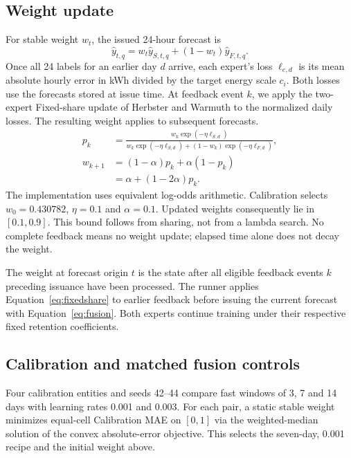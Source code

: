 \subsection{Weight update}
For stable weight $w_t$, the issued 24-hour forecast is
\begin{equation}
\hat y_{t,q}=w_t\hat y_{S,t,q}+(1-w_t)\hat y_{F,t,q}.
\label{eq:fusion}\end{equation}
Once all 24 labels for an earlier day $d$ arrive, each expert's loss $\ell_{e,d}$ is its mean absolute hourly error in kWh divided by the target energy scale $c_i$. Both losses use the forecasts stored at issue time.
At feedback event $k$, we apply the two-expert Fixed-share update of Herbster and Warmuth \cite{herbster1998} to the normalized daily losses. The resulting weight applies to subsequent forecasts.
\begin{equation}\begin{aligned}
p_k&=\frac{w_k\exp(-\eta\ell_{S,d})}
{w_k\exp(-\eta\ell_{S,d})+(1-w_k)\exp(-\eta\ell_{F,d})},\\
w_{k+1}&=(1-\alpha)p_k+\alpha(1-p_k)\\
&=\alpha+(1-2\alpha)p_k.
\end{aligned}\label{eq:fixedshare}\end{equation}
The implementation uses equivalent log-odds arithmetic. Calibration selects $w_0=0.430782$, $\eta=0.1$ and $\alpha=0.1$. Updated weights consequently lie in $[0.1,0.9]$. This bound follows from sharing, not from a lambda search. No complete feedback means no weight update; elapsed time alone does not decay the weight.

The weight at forecast origin $t$ is the state after all eligible feedback events $k$ preceding issuance have been processed. The runner applies Equation~\eqref{eq:fixedshare} to earlier feedback before issuing the current forecast with Equation~\eqref{eq:fusion}. Both experts continue training under their respective fixed retention coefficients.

\subsection{Calibration and matched fusion controls}
Four calibration entities and seeds 42--44 compare fast windows of 3, 7 and 14 days with learning rates 0.001 and 0.003. For each pair, a static stable weight minimizes equal-cell Calibration MAE on $[0,1]$ via the weighted-median solution of the convex absolute-error objective. This selects the seven-day, 0.001 recipe and the initial weight above.

